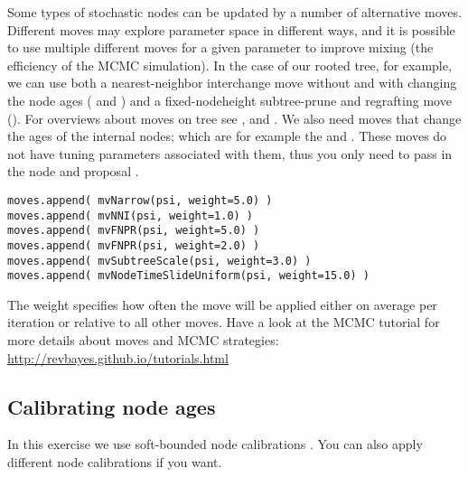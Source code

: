 Some types of stochastic nodes can be updated by a number of alternative moves. 
Different moves may explore parameter space in different ways, and it is possible to use multiple different moves for a given parameter to improve mixing (the efficiency of the MCMC simulation). 
In the case of our rooted tree, for example, we can use both a nearest-neighbor interchange move without and with changing the node ages ( and ) and a fixed-nodeheight subtree-prune and regrafting move (). 
For overviews about moves on tree see \cite{Lakner2008}, \cite{Hoehna2008} and \cite{Hoehna2012}.
We also need moves that change the ages of the internal nodes; which are for example the  and .
These moves do not have tuning parameters associated with them, thus you only need to pass in the  node and proposal . 
{\tt \begin{snugshade*}
\begin{lstlisting}
moves.append( mvNarrow(psi, weight=5.0) )
moves.append( mvNNI(psi, weight=1.0) )
moves.append( mvFNPR(psi, weight=5.0) )
moves.append( mvFNPR(psi, weight=2.0) )
moves.append( mvSubtreeScale(psi, weight=3.0) )
moves.append( mvNodeTimeSlideUniform(psi, weight=15.0) )
\end{lstlisting}
\end{snugshade*}}
The weight specifies how often the move will be applied either on average per iteration or relative to all other moves.
Have a look at the MCMC tutorial for more details about moves and MCMC strategies: \href{http://revbayes.github.io/tutorials.html}{http://revbayes.github.io/tutorials.html}

\subsection{Calibrating node ages}

In this exercise we use soft-bounded node calibrations \citep{Yang2006}.
You can also apply different node calibrations if you want.

